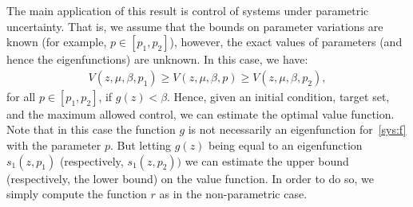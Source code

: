 \documentclass[letterpaper, 10pt, journal]{IEEEtran}  %
\begin{document}
The main application of this result is control of systems under parametric uncertainty. That is, we assume that the bounds on parameter variations are known (for example, $p\in[p_1,p_2]$), however, the exact values of parameters (and hence the eigenfunctions) are unknown. In this case, we have:
\begin{align*}
V(z, \mu, \beta, p_1) \ge V(z, \mu, \beta,p) \ge V(z, \mu, \beta,p_2),
\end{align*}
for all  $p\in[p_1, p_2]$, if  $g(z) < \beta$.
Hence, given an initial condition, target set, and the maximum allowed control, we can estimate the optimal value function. Note that in this case the function $g$ is not necessarily an eigenfunction for~\eqref{sys:f} with the parameter $p$. But letting $g(z)$ being equal to an eigenfunction $s_1(z, p_1)$ (respectively, $s_1(z, p_2))$ we can estimate the upper bound (respectively, the lower bound) on the value function. In order to do so, we simply compute the function $r$ as in the non-parametric case. 
\end{document}
